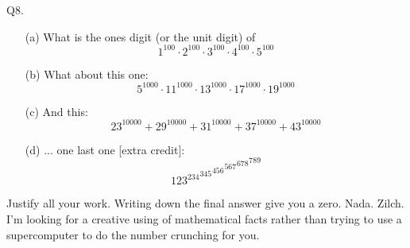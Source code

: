 \documentclass[a4paper,12pt]{article}
\begin{document}
Q8. \mbox{}
\begin{enumerate}[topsep=0in]
\item[(a)]
What is the ones digit (or the unit digit) of
\[
1^{100} \cdot 2^{100} \cdot 3^{100} \cdot 4^{100} \cdot 5^{100}
\]
\item[(b)] What about this one:
\[
5^{1000} \cdot 11^{1000} \cdot 13^{1000} \cdot 17^{1000} \cdot 19^{1000}
\]
\item[(c)]
And this:
\[
23^{10000} + 29^{10000} + 31^{10000} + 37^{10000} +
43^{10000}
\]
\item[(d)] ... one last one [extra credit]:
\[
{{{{{123^{234}}^{345}}^{456}}^{567}}^{678}}^{789}
\]
\end{enumerate}

Justify all your work. Writing down the final answer give you a zero.
Nada. Zilch. 
I'm looking for a creative using of mathematical facts rather than trying to 
use a supercomputer to do the number crunching for you.

\SOLUTION


\end{document}
